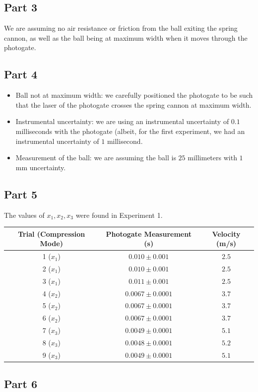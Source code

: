 \documentclass[8pt]{extarticle}
\begin{document}
{\subsection*{Part 3}
We are assuming no air resistance or friction from the ball exiting the spring cannon, as well as the ball being at maximum width when it moves through the photogate.
\subsection*{Part 4}
\begin{itemize}
	\item Ball not at maximum width: we carefully positioned the photogate to be such that the laser of the photogate crosses the spring cannon at maximum width.
	\item Instrumental uncertainty: we are using an instrumental uncertainty of $0.1$ milliseconds with the photogate (albeit, for the first experiment, we had an instrumental uncertainty of $1$ millisecond.
	\item Measurement of the ball: we are assuming the ball is $25$ millimeters with $1$mm uncertainty.
\end{itemize}
\subsection*{Part 5}
The values of $x_1,x_2,x_3$ were found in Experiment 1.
\begin{center}
	\renewcommand{\arraystretch}{1.5}
	\begin{tabular}{c|c|c}
		Trial (Compression Mode) & Photogate Measurement (s) & Velocity (m/s)\\
		\hline
		1 ($x_1$) & $0.010\pm 0.001$ & $2.5$\\
		2 ($x_1$) & $0.010\pm 0.001$ & $2.5$\\
		3 ($x_1$) & $0.011\pm 0.001$ & $2.5$\\
		4 ($x_2$) & $0.0067\pm 0.0001$ & $3.7$\\
		5 ($x_2$) & $0.0067\pm 0.0001$ & $3.7$\\
		6 ($x_2$) & $0.0067\pm 0.0001$ & $3.7$\\
		7 ($x_3$) & $0.0049\pm 0.0001$ & $5.1$\\
		8 ($x_3$) & $0.0048\pm 0.0001$ & $5.2$\\
		9 ($x_3$) & $0.0049\pm 0.0001$ & $5.1$
	\end{tabular}
\end{center}
\subsection*{Part 6}
}
\end{document}
